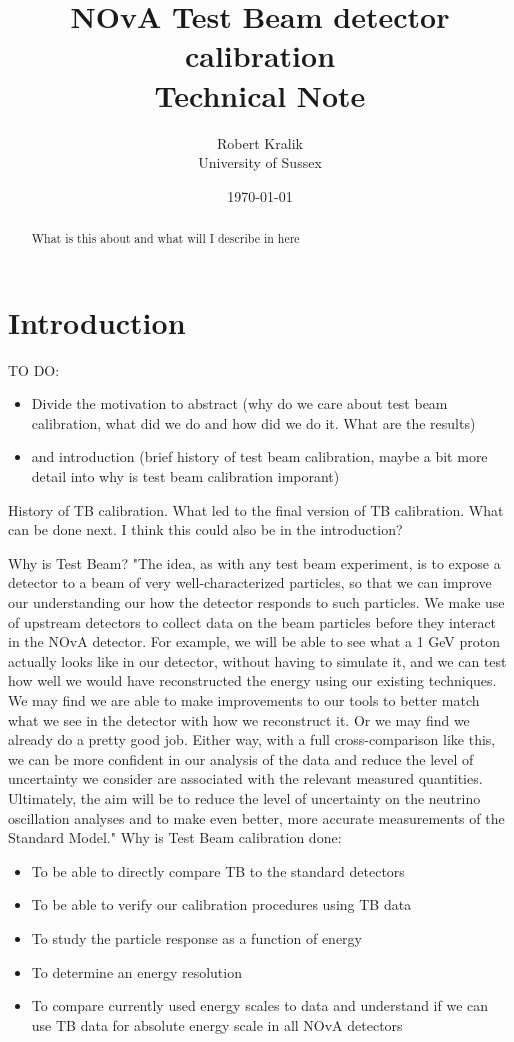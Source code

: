 \documentclass[12pt,a4paper]{article}
\author{Robert Kralik\\\small{University of Sussex}}
\title{NOvA Test Beam detector calibration\\ \vspace*{5mm}
\Large{Technical Note}}
\date{\today}
\begin{document}
\maketitle
\begin{abstract}
What is this about and what will I describe in here
\end{abstract}
\tableofcontents
\newpage

\section{Introduction}
TO DO:
\begin{itemize}
\item Divide the motivation to abstract (why do we care about test beam calibration, what did we do and how did we do it. What are the results)
\item and introduction (brief history of test beam calibration, maybe a bit more detail into why is test beam calibration imporant)
\end{itemize}

History of TB calibration. What led to the final version of TB calibration. What can be done next. I think this could also be in the introduction?

Why is Test Beam?
"The idea, as with any test beam experiment, is to expose a detector to a beam of very well-characterized particles, so that we can improve our understanding our how the detector responds to such particles. We make use of upstream detectors to collect data on the beam particles before they interact in the NOvA detector. For example, we will be able to see what a 1 GeV proton actually looks like in our detector, without having to simulate it, and we can test how well we would have reconstructed the energy using our existing techniques. We may find we are able to make improvements to our tools to better match what we see in the detector with how we reconstruct it. Or we may find we already do a pretty good job. Either way, with a full cross-comparison like this, we can be more confident in our analysis of the data and reduce the level of uncertainty we consider are associated with the relevant measured quantities. Ultimately, the aim will be to reduce the level of uncertainty on the neutrino oscillation analyses and to make even better, more accurate measurements of the Standard Model."%
Why is Test Beam calibration done:
\begin{itemize}
\item To be able to directly compare TB to the standard detectors
\item To be able to verify our calibration procedures using TB data
\item To study the particle response as a function of energy 
\item To determine an energy resolution
\item To compare currently used energy scales to data and understand if we can use TB data for absolute energy scale in all NOvA detectors
\end{itemize}
\end{document}
